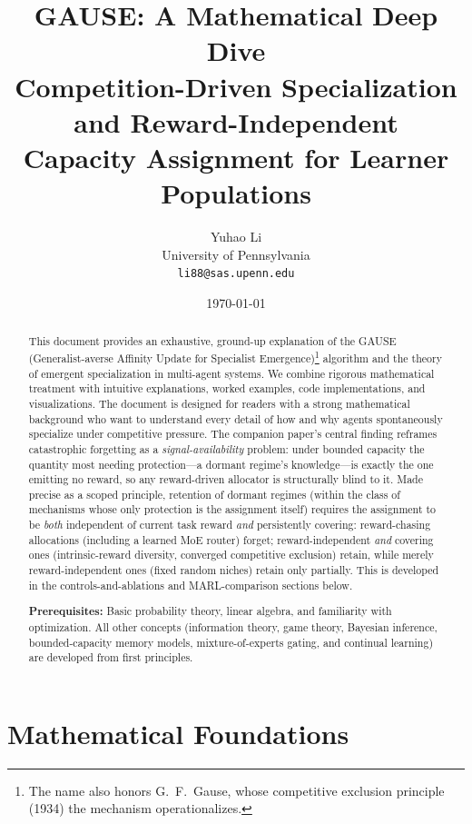 \documentclass[11pt,a4paper]{article}
\title{\Huge\textbf{GAUSE: A Mathematical Deep Dive}\\[0.5cm]
\Large Competition-Driven Specialization and Reward-Independent\\
Capacity Assignment for Learner Populations}
\author{Yuhao Li\\
University of Pennsylvania\\
\texttt{li88@sas.upenn.edu}}
\date{\today}
\theoremstyle{definition}
\theoremstyle{plain}
\begin{document}
\maketitle

\begin{abstract}
This document provides an exhaustive, ground-up explanation of the GAUSE
(Generalist-averse Affinity Update for Specialist Emergence)\footnote{The name
also honors G.~F.~Gause, whose competitive exclusion principle (1934) the
mechanism operationalizes.} algorithm and the theory of emergent specialization in multi-agent systems. We combine rigorous mathematical treatment with intuitive explanations, worked examples, code implementations, and visualizations. The document is designed for readers with a strong mathematical background who want to understand every detail of how and why agents spontaneously specialize under competitive pressure. The companion paper's central finding reframes catastrophic forgetting as a \emph{signal-availability} problem: under bounded capacity the quantity most needing protection---a dormant regime's knowledge---is exactly the one emitting no reward, so any reward-driven allocator is structurally blind to it. Made precise as a scoped principle, retention of dormant regimes (within the class of mechanisms whose only protection is the assignment itself) requires the assignment to be \emph{both} independent of current task reward \emph{and} persistently covering: reward-chasing allocations (including a learned MoE router) forget; reward-independent \emph{and} covering ones (intrinsic-reward diversity, converged competitive exclusion) retain, while merely reward-independent ones (fixed random niches) retain only partially. This is developed in the controls-and-ablations and MARL-comparison sections below.

\textbf{Prerequisites:} Basic probability theory, linear algebra, and familiarity with optimization. All other concepts (information theory, game theory, Bayesian inference, bounded-capacity memory models, mixture-of-experts gating, and continual learning) are developed from first principles.
\end{abstract}

\tableofcontents
\newpage

\part{Mathematical Foundations}
\end{document}
